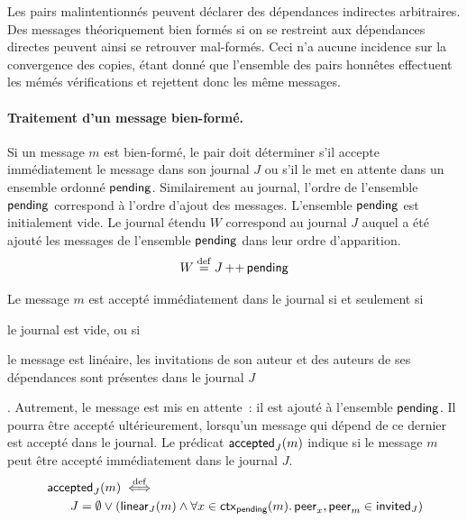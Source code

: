 \begin{remark}
Les pairs malintentionnés peuvent déclarer des dépendances indirectes arbitraires.
Des messages théoriquement bien formés si on se restreint aux dépendances directes peuvent ainsi se retrouver mal-formés.
Ceci n'a aucune incidence sur la convergence des copies, étant donné que l'ensemble des pairs honnêtes effectuent les mémés vérifications et rejettent donc les même messages.
\end{remark}


\paragraph{Traitement d'un message bien-formé.} Si un message $m$ est bien-formé, le pair doit déterminer s'il accepte immédiatement le message dans son journal $J$ ou s'il le met en attente dans un ensemble ordonné $\operatorname{\mathsf{pending}}$.
Similairement au journal, l'ordre de l'ensemble $\operatorname{\mathsf{pending}}$ correspond à l'ordre d'ajout des messages.
L'ensemble $\operatorname{\mathsf{pending}}$ est initialement vide.
Le journal étendu $W$ correspond au journal $J$ auquel a été ajouté les messages de l'ensemble $\operatorname{\mathsf{pending}}$ dans leur ordre d'apparition.
%
\begin{equation*}
    W \overset{\mathrm{def}}{=} J \operatorname{++} \operatorname{\mathsf{pending}}
\end{equation*}

Le message $m$ est accepté immédiatement dans le journal si et seulement si \begin{inlinelist}\item le journal est vide, ou si \item le message est linéaire, les invitations de son auteur et des auteurs de ses dépendances sont présentes dans le journal $J$\end{inlinelist}.
Autrement, le message est mis en attente~: il est ajouté à l'ensemble $\operatorname{\mathsf{pending}}$.
Il pourra être accepté ultérieurement, lorsqu'un message qui dépend de ce dernier est accepté dans le journal.
Le prédicat $\operatorname{\mathsf{accepted}}_J(m)$ indique si le message $m$ peut être accepté immédiatement dans le journal $J$.
%
\begin{equation}\begin{split}
    \MoveEqLeft\trm{accepted}_J(m) \defiff\\
    &J = \emptyset \lor (\trm{linear}_J(m) \land \forall x \in \trm{ctx}_{\trm{pending}}(m) \qsep \trm{peer}_x, \trm{peer}_m \in \trm{invited}_J)
\end{split}\end{equation}

